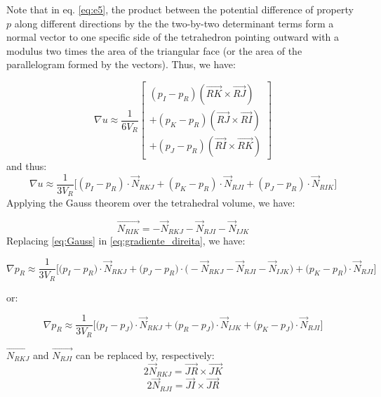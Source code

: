 \documentclass{article}
\begin{document}
Note that in eq. \ref{eq:e5}, the product between the potential difference of property $p$ along different directions by the the two-by-two determinant terms form a normal vector to one specific side of the tetrahedron pointing outward with a modulus two times the area of the triangular face (or the area of the parallelogram formed by the vectors). Thus, we have:

	\begin{equation} \label{eq:e6} 													
		\nabla u \approx \frac{1}{6V_{R}}
		\begin{bmatrix}
		(p_{I} - p_{R})(\vec{RK} \times \vec{RJ}) \\
		+
		(p_{K} - p_{R})(\vec{RJ} \times \vec{RI}) \\	
		+
		(p_{J} - p_{R})(\vec{RI} \times \vec{RK})
		\end{bmatrix}	
	\end{equation}
and thus:
	\begin{equation}	\label{eq:gradiente_direita}												
			\nabla u \approx \frac{1}{3V_{R}} \Big[
		(p_{I} - p_{R}) \cdot \vec{N}_{RKJ} +
		(p_{K} - p_{R})\cdot \vec{N}_{RJI}	+ 
		(p_{J} - p_{R})\cdot \vec{N}_{RIK}
		 \Big]
	\end{equation}
	Applying the Gauss theorem over the tetrahedral volume, we have:

\begin{equation} \label{eq:Gauss}
\vec{N_{RIK}} = -\vec{N}_{RKJ} - \vec{N}_{RJI} - \vec{N}_{IJK}
\end{equation}
Replacing \ref{eq:Gauss} in \ref{eq:gradiente_direita}, we have:

\begin{equation} \label{eq:gradiente_direita_Gauss}
\nabla p_{R} \approx \frac{1}{3V_{R}}\bigg[ \big( p_{I} - p_{R}\big) \cdot \vec{N}_{RKJ} + 
\big( p_{J} - p_{R}\big) \cdot \bigg(-\vec{N}_{RKJ} - \vec{N}_{RJI} - \vec{N}_{IJK} \bigg) +
\big( p_{K} - p_{R}\big) \cdot \vec{N}_{RJI} \bigg]
\end{equation}

or:

\begin{equation} \label{eq:gradiente_direita_vetores_rearranjado}
\nabla p_{R} \approx \frac{1}{3V_{R}}\bigg[ \big( p_{I} - p_{J}\big) \cdot \vec{N}_{RKJ} + 
\big( p_{R} - p_{J}\big) \cdot \vec{N}_{IJK} +
\big( p_{K} - p_{J} \big) \cdot \vec{N}_{RJI} \bigg]
\end{equation}

$\vec{N_{RKJ}}$ and $\vec{N_{RJI}}$ can be replaced by, respectively:
\begin{equation} \label{eq:N_RKJ_vec}
2 \vec{N}_{RKJ} = \vec{JR} \times \vec{JK}
\end{equation}
\begin{equation} \label{eq:N_RJI_vec}
2 \vec{N}_{RJI} = \vec{JI} \times \vec{JR} 
\end{equation}
\end{document}
